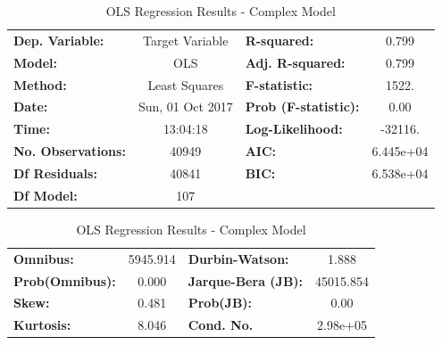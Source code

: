 \documentclass[]{article}
\begin{document}
%
\begin{table}
\begin{center}
	\begin{tabular}{lclc}
	\toprule
	\textbf{Dep. Variable:}                                       & Target Variable  & \textbf{  R-squared:         } &     0.799   \\
	\textbf{Model:}                                               &       OLS        & \textbf{  Adj. R-squared:    } &     0.799   \\
	\textbf{Method:}                                              &  Least Squares   & \textbf{  F-statistic:       } &     1522.   \\
	\textbf{Date:}                                                & Sun, 01 Oct 2017 & \textbf{  Prob (F-statistic):} &     0.00    \\
	\textbf{Time:}                                                &     13:04:18     & \textbf{  Log-Likelihood:    } &   -32116.   \\
	\textbf{No. Observations:}                                    &       40949      & \textbf{  AIC:               } & 6.445e+04   \\
	\textbf{Df Residuals:}                                        &       40841      & \textbf{  BIC:               } & 6.538e+04   \\
	\textbf{Df Model:}                                            &         107      & \textbf{                     } &             \\
	\bottomrule
\end{tabular}

\begin{tabular}{lclc}
	\textbf{Omnibus:}       & 5945.914 & \textbf{  Durbin-Watson:     } &     1.888  \\
	\textbf{Prob(Omnibus):} &   0.000  & \textbf{  Jarque-Bera (JB):  } & 45015.854  \\
	\textbf{Skew:}          &   0.481  & \textbf{  Prob(JB):          } &      0.00  \\
	\textbf{Kurtosis:}      &   8.046  & \textbf{  Cond. No.          } &  2.98e+05  \\
	\bottomrule
	\end{tabular}
\end{center}
\caption{OLS Regression Results - Complex Model}
\label{tab:complex_summary}
\end{table}
%
\end{document}
